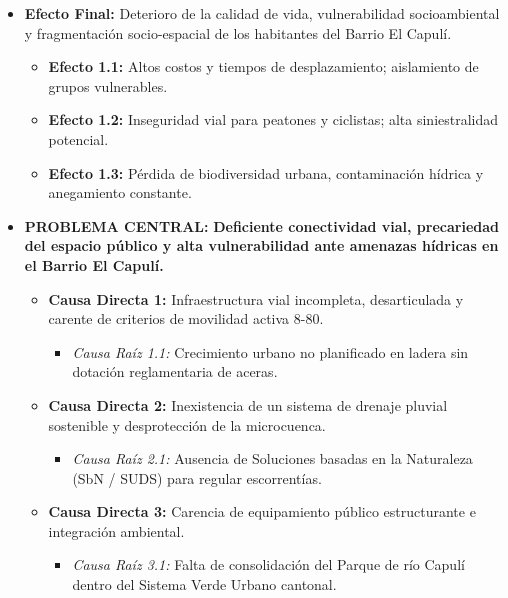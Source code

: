 \documentclass[
  letterpaper,
  DIV=11,
  numbers=noendperiod]{scrreprt}
\providecommand{\tightlist}{%
  \setlength{\itemsep}{0pt}\setlength{\parskip}{0pt}}
\begin{document}
\begin{itemize}
\tightlist
\item
  \textbf{Efecto Final:} Deterioro de la calidad de vida, vulnerabilidad
  socioambiental y fragmentación socio-espacial de los habitantes del
  Barrio El Capulí.

  \begin{itemize}
  \tightlist
  \item
    \textbf{Efecto 1.1:} Altos costos y tiempos de desplazamiento;
    aislamiento de grupos vulnerables.
  \item
    \textbf{Efecto 1.2:} Inseguridad vial para peatones y ciclistas;
    alta siniestralidad potencial.
  \item
    \textbf{Efecto 1.3:} Pérdida de biodiversidad urbana, contaminación
    hídrica y anegamiento constante.
  \end{itemize}
\item
  \textbf{PROBLEMA CENTRAL:} \textbf{Deficiente conectividad vial,
  precariedad del espacio público y alta vulnerabilidad ante amenazas
  hídricas en el Barrio El Capulí.}

  \begin{itemize}
  \tightlist
  \item
    \textbf{Causa Directa 1:} Infraestructura vial incompleta,
    desarticulada y carente de criterios de movilidad activa 8-80.

    \begin{itemize}
    \tightlist
    \item
      \emph{Causa Raíz 1.1:} Crecimiento urbano no planificado en ladera
      sin dotación reglamentaria de aceras.
    \end{itemize}
  \item
    \textbf{Causa Directa 2:} Inexistencia de un sistema de drenaje
    pluvial sostenible y desprotección de la microcuenca.

    \begin{itemize}
    \tightlist
    \item
      \emph{Causa Raíz 2.1:} Ausencia de Soluciones basadas en la
      Naturaleza (SbN / SUDS) para regular escorrentías.
    \end{itemize}
  \item
    \textbf{Causa Directa 3:} Carencia de equipamiento público
    estructurante e integración ambiental.

    \begin{itemize}
    \tightlist
    \item
      \emph{Causa Raíz 3.1:} Falta de consolidación del Parque de río
      Capulí dentro del Sistema Verde Urbano cantonal.
    \end{itemize}
  \end{itemize}
\end{itemize}
\end{document}
